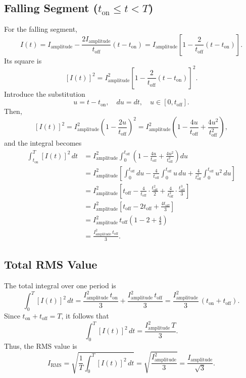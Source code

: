 \documentclass{article}
\begin{document}
\subsection{Falling Segment ($t_{\text{on}}\le t < T$)}

For the falling segment,
\[
I(t) = I_{\text{amplitude}} - \frac{2I_{\text{amplitude}}}{t_{\text{off}}}(t-t_{\text{on}}) = I_{\text{amplitude}}\left[1 - \frac{2}{t_{\text{off}}}(t-t_{\text{on}})\right].
\]
Its square is
\[
[I(t)]^2 = I_{\text{amplitude}}^2\left[1 - \frac{2}{t_{\text{off}}}(t-t_{\text{on}})\right]^2.
\]
Introduce the substitution
\[
u = t-t_{\text{on}}, \quad du = dt, \quad u \in [0, t_{\text{off}}].
\]
Then,
\[
[I(t)]^2 = I_{\text{amplitude}}^2 \left(1 - \frac{2u}{t_{\text{off}}}\right)^2
= I_{\text{amplitude}}^2 \left(1 - \frac{4u}{t_{\text{off}}} + \frac{4u^2}{t_{\text{off}}^2}\right),
\]
and the integral becomes
\begin{align*}
\int_{t_{\text{on}}}^{T} [I(t)]^2\, dt 
&= I_{\text{amplitude}}^2 \int_0^{t_{\text{off}}} \left(1 - \frac{4u}{t_{\text{off}}} + \frac{4u^2}{t_{\text{off}}^2}\right) du \\
&= I_{\text{amplitude}}^2 \left[ \int_0^{t_{\text{off}}} du - \frac{4}{t_{\text{off}}}\int_0^{t_{\text{off}}} u\,du + \frac{4}{t_{\text{off}}^2}\int_0^{t_{\text{off}}} u^2\,du \right] \\
&= I_{\text{amplitude}}^2 \left[ t_{\text{off}} - \frac{4}{t_{\text{off}}}\cdot\frac{t_{\text{off}}^2}{2} + \frac{4}{t_{\text{off}}^2}\cdot\frac{t_{\text{off}}^3}{3} \right] \\
&= I_{\text{amplitude}}^2 \left[ t_{\text{off}} - 2t_{\text{off}} + \frac{4t_{\text{off}}}{3} \right] \\
&= I_{\text{amplitude}}^2\,t_{\text{off}} \left(1 - 2 + \frac{4}{3}\right) \\
&= \frac{I_{\text{amplitude}}^2\,t_{\text{off}}}{3}.
\end{align*}

\subsection{Total RMS Value}

The total integral over one period is
\[
\int_0^T [I(t)]^2\, dt = \frac{I_{\text{amplitude}}^2\,t_{\text{on}}}{3} + \frac{I_{\text{amplitude}}^2\,t_{\text{off}}}{3}
= \frac{I_{\text{amplitude}}^2}{3}\,(t_{\text{on}}+t_{\text{off}}).
\]
Since \(t_{\text{on}}+t_{\text{off}} = T\), it follows that
\[
\int_0^T [I(t)]^2\, dt = \frac{I_{\text{amplitude}}^2\,T}{3}.
\]
Thus, the RMS value is
\[
I_{\text{RMS}} = \sqrt{\frac{1}{T}\int_0^T [I(t)]^2\, dt}
= \sqrt{\frac{I_{\text{amplitude}}^2}{3}}
= \frac{I_{\text{amplitude}}}{\sqrt{3}}.
\]
\end{document}
